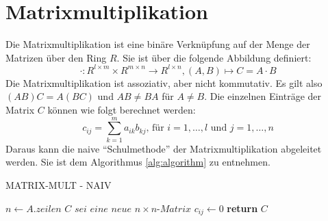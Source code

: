 \section{Matrixmultiplikation}
\label{sec:abschn2}
Die Matrixmultiplikation ist eine binäre Verknüpfung auf der Menge der Matrizen über den Ring $R$.
Sie ist über die folgende Abbildung definiert: 
\[
\cdot: R^{l\times m} \times R^{m\times n} \rightarrow R^{l\times n}, (A, B) \mapsto C = A \cdot B
\]
Die Matrixmultiplikation ist assoziativ, aber nicht kommutativ. Es gilt also $(AB)C = A(BC)$ und $AB \neq BA$ für $A \neq B$.
Die einzelnen Einträge der Matrix $C$ können wie folgt berechnet werden:
\[
c_{ij} = \sum_{k=1}^{m} a_{ik}b_{kj} \text{, für }i = 1, \dots, l \text{ und }j = 1, \dots, n
\]
Daraus kann die naive \enquote{Schulmethode} der Matrixmultiplikation abgeleitet werden. Sie ist dem Algorithmus \ref{alg:algorithm} zu entnehmen. 
\begin{algorithm}[hbt!]
\begin{algorithmic}[1]
\caption{MATRIX-MULT - NAIV}
    \State $n\gets A.zeilen$
    \State $C$ $sei$ $eine$ $neue$ $n\times n$-$Matrix$
            \State $c_{ij} \gets 0$
            \EndFor
        \EndFor
    \EndFor
    \State \textbf{return} $C$ 
\EndProcedure
\end{algorithmic}\label{alg:algorithm}
\end{algorithm}

